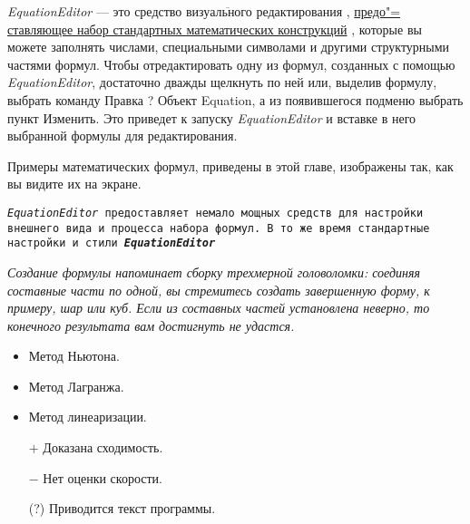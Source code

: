\documentclass[12pt,a4paper]{article}
\begin{document}
\begin{flushleft}


\textrm{\colorbox{onE}{\it EquationEditor} --- $\overline{\mbox {это средство визуального редактирования}}$ ,  \underline{предо"=} \underline{ставляющее набор стандартных математических конструкций} , которые вы можете заполнять числами, специальными символами и другими структурными частями формул. Чтобы отредактировать одну из формул, созданных с помощью {\it EquationEditor}, достаточно дважды щелкнуть по ней или, выделив формулу, выбрать команду Правка ? Объект Equation, а из появившегося подменю выбрать пункт Изменить. Это приведет к запуску {\it EquationEditor} и вставке в него выбранной \textcolor{twO}{формулы для редактирования.}}

\end{flushleft}

\textsf{Примеры {\Huge математических формул}, приведены в этой главе, изображены так, как вы видите их на экране.}

\begin{flushright}


\texttt{{\it EquationEditor} предоставляет немало мощных средств для настройки внешнего вида и процесса набора формул. В то же время стандартные настройки и стили {\it {\bfseries EquationEditor}} }


\end{flushright}

\itshape{Создание формулы напоминает сборку трехмерной головоломки: соединяя составные части по одной, вы стремитесь создать завершенную форму, к примеру, шар или куб. Если { из составных частей} установлена неверно, то конечного результата вам достигнуть не удастся.}


\begin{itemize}
\item Метод Ньютона.
\item Метод Лагранжа.
\item Метод линеаризации.
\end{itemize}
\begin{itemize}
\item[$+$] Доказана сходимость.
\item[$-$] Нет оценки скорости.
\item[(?)] Приводится текст программы.
\end{itemize}
\end{document}
